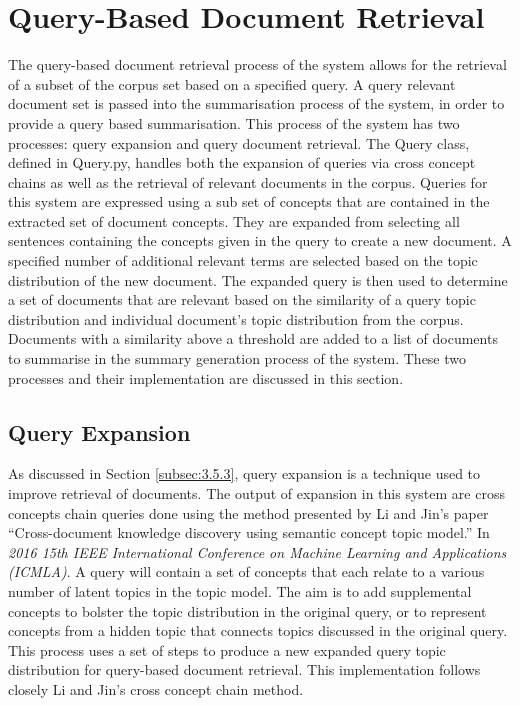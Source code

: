 \section{Query-Based Document Retrieval}
The query-based document retrieval process of the system allows for the retrieval of a subset of the corpus set based on a specified query. A query relevant document set is passed into the summarisation process of the system, in order to provide a query based summarisation. This process of the system has two processes: query expansion and query document retrieval. The Query class, defined in Query.py, handles both the expansion of queries via cross concept chains as well as the retrieval of relevant documents in the corpus. Queries for this system are expressed using a sub set of concepts that are contained in the extracted set of document concepts. They are expanded from selecting all sentences containing the concepts given in the query to create a new document.  A specified number of additional relevant terms are selected based on the topic distribution of the new document. The expanded query is then used to determine a set of documents that are relevant based on the similarity of a query topic distribution and individual document’s topic distribution from the corpus. Documents with a similarity above a threshold are added to a list of documents to summarise in the summary generation process of the system.  These two processes and their implementation are discussed in this section.

\subsection{Query Expansion}
As discussed in Section \ref{subsec:3.5.3}, query expansion is a technique used to improve retrieval of documents. The output of expansion in this system are cross concepts chain queries done using the method presented by Li and Jin’s \citeyear{li2016cross} paper “Cross-document knowledge discovery using semantic concept topic model.” In \emph{2016 15th IEEE International Conference on Machine Learning and Applications (ICMLA)}. A query will contain a set of concepts that each relate to a various number of latent topics in the topic model. The aim is to add supplemental concepts to bolster the topic distribution in the original query, or to represent concepts from a hidden topic that connects topics discussed in the original query. This process uses a set of steps to produce a new expanded query topic distribution for query-based document retrieval. This implementation follows closely Li and Jin’s \citeyear{li2016cross} cross concept chain method.

